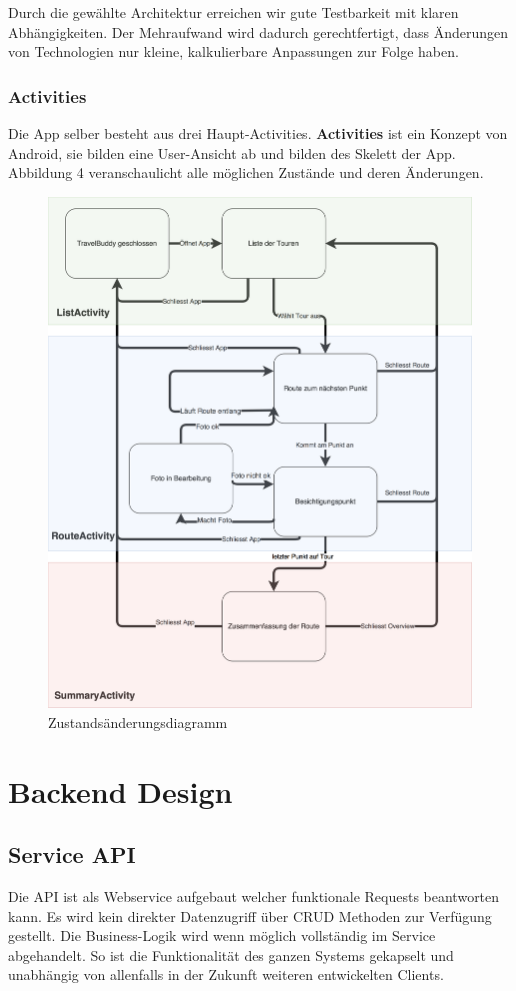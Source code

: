 \documentclass[a4paper,10pt,xetex]{article}
\begin{document}
Durch die gewählte Architektur erreichen wir gute Testbarkeit mit klaren
Abhängigkeiten. Der Mehraufwand wird dadurch gerechtfertigt, dass Änderungen
von Technologien nur kleine, kalkulierbare Anpassungen zur Folge haben.

\subsubsection{Activities}\label{activities}
Die App selber besteht aus drei Haupt-Activities. \textbf{Activities} ist ein
Konzept von Android, sie bilden eine User-Ansicht ab und bilden des Skelett
der App. Abbildung 4 veranschaulicht alle möglichen Zustände und deren
Änderungen.
\begin{figure}
  \centering
  \includegraphics{state-diagram}
  \caption{Zustandsänderungsdiagramm}
\end{figure}


\section{Backend Design}\label{backend-design}
\subsection{Service API}\label{service-api}
Die API ist als Webservice aufgebaut welcher funktionale Requests beantworten kann. Es wird kein direkter Datenzugriff
\"uber CRUD Methoden zur Verf\"ugung gestellt. Die Business-Logik wird wenn m\"oglich vollst\"andig im Service
abgehandelt. So ist die Funktionalit\"at des ganzen Systems gekapselt und unabh\"angig von allenfalls in der Zukunft
weiteren entwickelten Clients.
\end{document}
